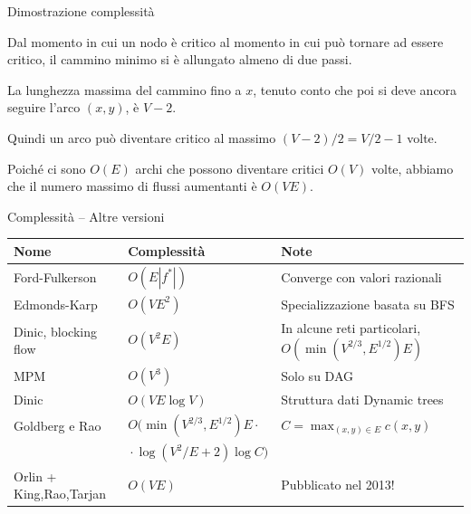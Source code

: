 \begin{frame}{Dimostrazione complessità}

\BIL
\item Dal momento in cui un nodo è critico al momento in cui può tornare ad essere critico, il cammino minimo si è allungato almeno di due passi.
\item La lunghezza massima del cammino fino a $x$, tenuto conto che poi si deve ancora seguire l'arco $(x,y)$,
è $V-2$.
\item Quindi un arco può diventare critico al massimo $(V-2)/2 = V/2-1$ volte.
\item Poiché ci sono $O(E)$ archi che possono diventare critici $O(V)$ volte,
abbiamo che il numero massimo di flussi aumentanti è $O(VE)$. 
\EIL

\end{frame}


\begin{frame}{Complessità -- Altre versioni}

\small
\begin{tabular}{|P{2.6cm}|P{3.5cm}|P{4.1cm}|}
\hline
\textbf{Nome} & \textbf{Complessità} & \textbf{Note} \\\hline
Ford-Fulkerson & $O(E|f^*|)$ & Converge con valori razionali \\\hline
Edmonds-Karp & $O(VE^2)$ & Specializzazione basata su BFS \\\hline
Dinic, blocking flow & $O(V^2E)$ & In alcune reti particolari, $O(\min(V^{2/3},E^{1/2})E)$ \\\hline
MPM & $O(V^3)$ & Solo su DAG \\\hline
Dinic & $O(VE \log V)$ & Struttura dati Dynamic trees \\\hline
Goldberg e Rao & \begingroup \footnotesize $O(\min(V^{2/3},E^{1/2})E \cdot {}$ \endgroup & $C=\max_{(x,y) \in E} c(x,y)$ \\
& \begingroup \footnotesize  ${} \cdot \log (V^2/E+2) \log C)$ \endgroup & \\\hline

Orlin + King,Rao,Tarjan & $O(VE)$ & Pubblicato nel 2013!\\\hline
\end{tabular}

\medskip
{}

\end{frame}


